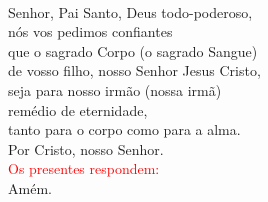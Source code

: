 \documentclass{book}
\begin{document}
\begin{flushleft}
    \vspace{.1cm} \\
    Senhor, Pai Santo, Deus todo-poderoso, \\
    nós vos pedimos confiantes \\
    que o sagrado Corpo (o sagrado Sangue) \\
    de vosso filho, nosso Senhor Jesus Cristo, \\
    seja para nosso irmão (nossa irmã) \\
    remédio de eternidade, \\
    tanto para o corpo como para a alma. \\
    Por Cristo, nosso Senhor.
    \vspace{.1cm} \\
    \textcolor{red}{Os presentes respondem:}
    \vspace{.1cm} \\
    Amém.
\end{flushleft}
\end{document}
